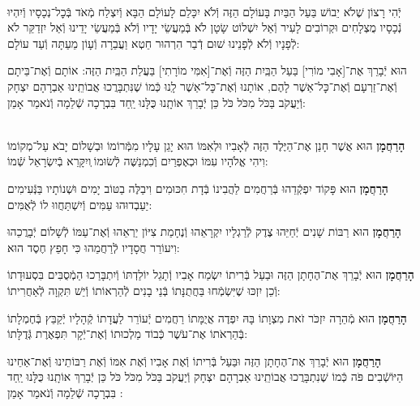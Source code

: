 \documentclass[twoside, openany, parskip=half, 11pt]{book}
\begin{document}
\begin{footnotesize}
\\
יְֿהִי רָצוֹן שֶׁלֹא יֵבוֹשׁ בַּעַל הַבַּיִת בָּעוֹלָם הַזֶּה וְֿלֹא יִכָּלֵם לָעוֹלָם הַבָּא וְֿיִצְלַח מְֿאֹד בְּֿכׇל־נְכָסָיו וְֿיִהְיוּ נְֿכָסָיו מֻצְלָחִים וּקְרוֹבִים לָעִיר וְֿאַל יִשְׁלוֹט שָׂטָן לֹא בְּֿמַעֲשֵׂי יָדָיו וְֿלֹא בְּֿמַעֲשֵׂי יָדֵינוּ וְֿאַל יִזְדַקֵּר לֹא לְֿפָנָיו וְֿלֹא לְֿפָנֵינוּ שׁוּם דְֿבַר הִרְהוּר חֵטְא וַעֲבֵרָה וְֿעָוֹן מֵעַתָּה וְֿעַד עוֹלָם:

\end{footnotesize}

הוּא יְֿבָרֵךְ אֶת־[אָבִי מוֹרִי] בַּעַל הַבַּֽיִת הַזֶּה וְֿאֶת־[אִמִּי מוֹרָתִי] בַּעֲלַת הַבַּֽיִת הַזֶּה: אוֹתָם וְֿאֶת־בֵּיתָם וְֿאֶת־זַרְעָם וְֿאֶת־כׇּל־אַשֶׁר לָהֶם, אוֹתָנוּ וְֿאֶת־כׇּל־אַשֶׁר לָֽנוּ כְּֿמוֹ שֶׁנִּתְבָּרֲכוּ אֲבוֹתֵֽינוּ אַבְרָהָם יִצְחָק וְֿיַעֲקֹב בַּכֹּל מִכֹּל כֹּל כֵּן יְֿבָרֵךְ אוֹתָֽנוּ כֻּלָּנוּ יַֽחַד בִּבְרָכָה שְֿׁלֵמָה וְֿנֹאמַר אָמֵן:

\begin{sometimes}

\\
\textbf{הָרַחֲמָן}
הוּא אֲשֶׁר חָנַן אֶת־הַיֶּלֶד הַזֶּה לְֿאָבִיו וּלְאִמּוֹ הוּא יָגֵן עָלָיו מִמְּֿרוֹמוֹ וּבְשָׁלוֹם יָבֹא עַל־מְקוֹמוֹ וִיהִי אֱלֹהָיו עִמּוֹ וּכְאֶפְרַיִם וְֿכִמְנַשֶּׁה לְֿשׂוּמוֹ ְויִקָּרֵא בְֿיִשְׂרָאֵל שְֿׁמוֹ:

\textbf{הָרַחֲמָן}
הוּא פָּקוֹד יִפְקְֿדֵהוּ בְּֿרַחֲמִים לַהֲבִינוֹ בְּֿדָת חִכּוּמִים וִיבַלֶּה בַטּוֹב יָמִים וּשְׁנוֹתָיו בַּנְּֿעִימִים יַעַבְדוּהוּ עַמִּים וְֿיִשְׁתַּחֲווּ לוֹ לְֿאֻמִּים:

\textbf{הָרַחֲמָן}
הוּא רַבּוֹת שָׁנִים יְֿחַיֵּהוּ צֶדֶק לְֿרַגְלָיו יִקְרָאֵהוּ וְֿנֶחָמַת צִיּוֹן יַרְאֵהוּ וְֿאֶת־עַמּוֹ לְֿשָׁלוֹם יְֿבָרֲכֵהוּ וִיעוֹרֵר חֲסָדָיו לְֿרַחֲמֵהוּ כִּי חָפֵץ חֶסֶד הוּא:

\textbf{הָרַחֲמָן}
הוּא יְֿבָרֵךְ אֶת־הֶחָתָן הַזֶּה וּבַעַל בְּֿרִיתוֹ יִשְׂמַח אָבִיו וְֿתָגֵל יוֹלַדְתּוֹ וְֿיִתְבָּרַכוּ הַמְֿסֻבִּים בִּסְעוּדָתוֹ וְֿכֵן יִזְכּוּ שֶׁיִּשְׂמְֿחוּ בַּחֲתֻנָּתוֹ בְּֿנֵי בָנִים לְֿהַרְאוֹתוֹ וְֿיֵשׁ תִּקְוָה לְֿאַחֲרִיתוֹ:

\textbf{הָרַחֲמָן}
הוּא מְֿהֵרָה יִזְכֹּר זֹאת מִצְוָתוֹ בָּהּ יִפְדֶה אֲיֻמָּתוֹ רַחֲמִים יְֿעוֹרֵר לַעֲדָתוֹ קְֿהָלָיו יְֿקַבֵּץ בְּֿחֶמְלָתוֹ בְּֿהַרְאֹתוֹ אֶת־עֹשֶׁר כְּֿבוֹד מַלְכוּתוֹ וְֿאֶת־יְֿקָר תִּפְאֶרֶת גְּֿדֻלָּתוֹ:

\textbf{הָרַחֲמָן}
הוּא יְֿבָרֵךְ אֶת־הֶחָתָן הַזֶּה וּבַּעַל בְּֿרִיתוֹ וְֿאֶת אָבִיו וְֿאֶת אִמּוֹ וְֿאֶת רַבּוֹתֵינוּ וְֿאֶת־אַחֵינוּ הַיּוֹשְֿׁבִים פֹּה כְּֿמוֹ שֶׁנִתְבָּרֲכוּ אֲבוֹתֵֽינוּ אַבְרָהָם יִצְחָק וְֿיַעֲקֹב בַּכֹּל מִכֹּל כֹּל כֵּן יְֿבָרֵךְ אוֹתָֽנוּ כֻּלָּנוּ יַֽחַד בִּבְרָכָה שְֿׁלֵמָה וְֿנֹאמַר אָמֵן
:

\end{sometimes}
\end{document}
